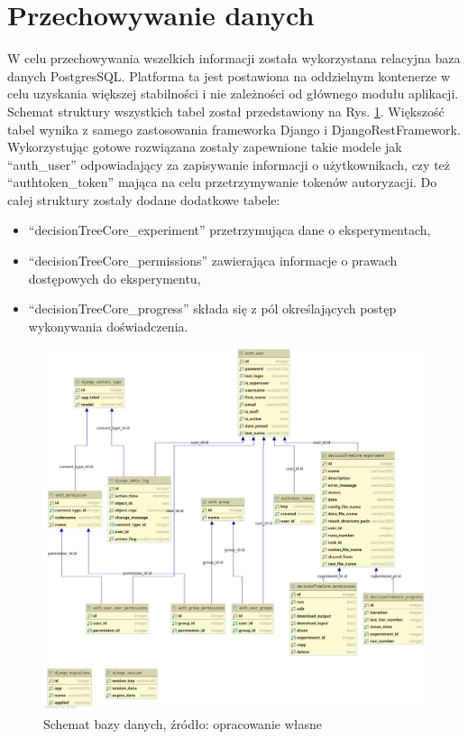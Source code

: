 \section{Przechowywanie danych}
W celu przechowywania wszelkich informacji została wykorzystana relacyjna baza danych PostgresSQL. Platforma ta jest postawiona na oddzielnym kontenerze w celu uzyskania większej stabilności i nie zależności od głównego modułu aplikacji. Schemat struktury wszystkich tabel został przedstawiony na Rys. \ref{rys5_database_schema}. Większość tabel wynika z samego zastosowania frameworka Django i DjangoRestFramework. Wykorzystując gotowe rozwiązana zostały zapewnione takie modele jak \enquote{auth\_user} odpowiadający za zapisywanie informacji o użytkownikach, czy też \enquote{authtoken\_token} mająca na celu przetrzymywanie tokenów autoryzacji. Do całej struktury zostały dodane dodatkowe tabele:
\begin{itemize}
	\item \enquote{decisionTreeCore\_experiment} przetrzymująca dane o eksperymentach,  
	\item \enquote{decisionTreeCore\_permissions} zawierająca informacje o prawach dostępowych do eksperymentu,
	\item \enquote{decisionTreeCore\_progress} składa się z pól określających postęp wykonywania doświadczenia.
\end{itemize}



\begin{figure}[htb]
	\centering
	\includegraphics[angle=270, width=16cm]{grafika/database_schema.eps}
	\caption{Schemat bazy danych, źródło: opracowanie własne}
	\label{rys5_database_schema}
\end{figure}

